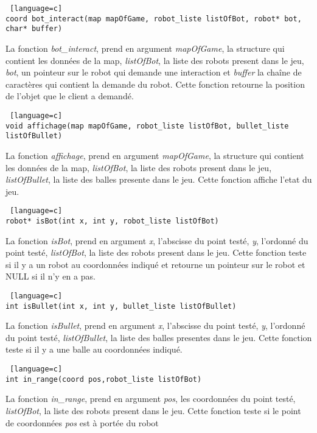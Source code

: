 \documentclass[a4paper, 11pt]{article}
\begin{document}
\begin {lstlisting} [language=c]
coord bot_interact(map mapOfGame, robot_liste listOfBot, robot* bot, char* buffer)
\end{lstlisting}
La fonction \emph{bot\_interact}, prend en argument \emph{mapOfGame}, la structure qui contient les données de la map, \emph{listOfBot}, la liste des robots present dans le jeu, \emph{bot}, un pointeur sur le robot qui demande une interaction et \emph{buffer} la chaîne de caractères qui contient la demande du robot. Cette fonction retourne la position de l'objet que le client a demandé.\\

\begin {lstlisting} [language=c]
void affichage(map mapOfGame, robot_liste listOfBot, bullet_liste listOfBullet)
\end{lstlisting}
La fonction \emph{affichage}, prend en argument \emph{mapOfGame}, la structure qui contient les données de la map, \emph{listOfBot}, la liste des robots present dans le jeu, \emph{listOfBullet}, la liste des balles presente dans le jeu. Cette fonction affiche l'etat du jeu.\\

\begin {lstlisting} [language=c]
robot* isBot(int x, int y, robot_liste listOfBot)
\end{lstlisting}
La fonction \emph{isBot}, prend en argument \emph{x}, l'abscisse du point testé, \emph{y}, l'ordonné du point testé, \emph{listOfBot}, la liste des robots present dans le jeu. Cette fonction teste si il y a un robot au coordonnées indiqué et retourne un pointeur sur le robot et NULL si il n'y en a pas.\\

\begin {lstlisting} [language=c]
int isBullet(int x, int y, bullet_liste listOfBullet)
\end{lstlisting}
La fonction \emph{isBullet}, prend en argument \emph{x}, l'abscisse du point testé, \emph{y}, l'ordonné du point testé, \emph{listOfBullet}, la liste des balles presentes dans le jeu. Cette fonction teste si il y a une balle au coordonnées indiqué.\\

\begin {lstlisting} [language=c]
int in_range(coord pos,robot_liste listOfBot)
\end{lstlisting}
La fonction \emph{in_range}, prend en argument \emph{pos}, les coordonnées du point testé, \emph{listOfBot}, la liste des robots present dans le jeu. Cette fonction teste si le point de coordonnées \emph{pos} est à portée du robot\\
\end{document}
